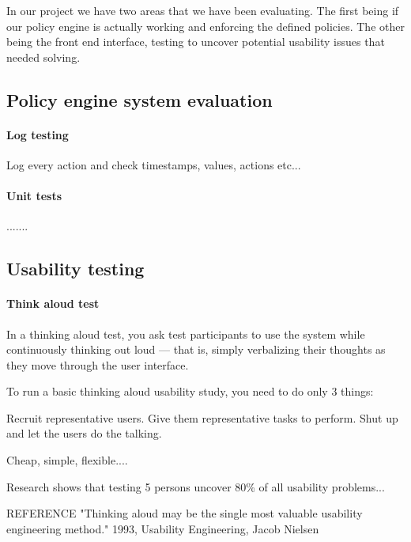 In our project we have two areas that we have been evaluating. The first being if our policy engine is actually working and enforcing the defined policies. The other being the front end interface, testing to uncover potential usability issues that needed solving.

\subsection{Policy engine system evaluation}

\paragraph{Log testing}

Log every action and check timestamps, values, actions etc...

\paragraph{Unit tests}
.......

\subsection{Usability testing}

\paragraph{Think aloud test}

In a thinking aloud test, you ask test participants to use the system while continuously thinking out loud — that is, simply verbalizing their thoughts as they move through the user interface.

To run a basic thinking aloud usability study, you need to do only 3 things:

Recruit representative users.
Give them representative tasks to perform.
Shut up and let the users do the talking.


Cheap, simple, flexible....

Research shows that testing 5 persons uncover 80\% of all usability problems...


REFERENCE
"Thinking aloud may be the single most valuable usability engineering method." 1993, Usability Engineering, Jacob Nielsen